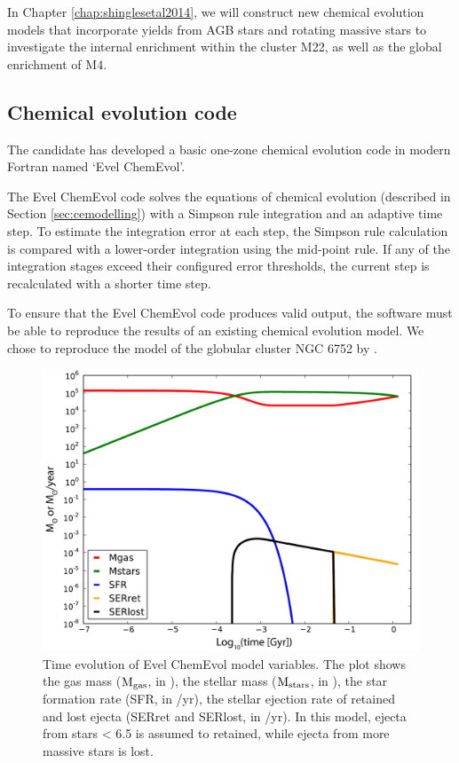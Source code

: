 In Chapter \ref{chap:shinglesetal2014}, we will construct new chemical evolution models that incorporate yields from \gls{AGB} stars and rotating massive stars to investigate the internal \sprocess enrichment within the cluster M22, as well as the global \sprocess enrichment of M4.

\subsection{Chemical evolution code}
The candidate has developed a basic one-zone chemical evolution code in modern Fortran named `Evel ChemEvol'.

The Evel ChemEvol code solves the equations of chemical evolution (described in Section \ref{sec:cemodelling}) with a Simpson rule integration and an adaptive time step. To estimate the integration error at each step, the Simpson rule calculation is compared with a lower-order integration using the mid-point rule. If any of the integration stages exceed their configured error thresholds, the current step is recalculated with a shorter time step.

To ensure that the Evel ChemEvol code produces valid output, the software must be able to reproduce the results of an existing chemical evolution model. We chose to reproduce the model of the globular cluster NGC 6752 by \citet[][hereafter, F04]{Fenner:2004ju}.

\begin{figure}
 \begin{center}\includegraphics[width=\textwidth]{figures/cemodel}\end{center}
 \caption{Time evolution of Evel ChemEvol model variables. The plot shows the gas mass ($\mathrm{M}_\mathrm{gas}$, in \Msun), the stellar mass ($\mathrm{M}_\mathrm{stars}$, in \Msun), the star formation rate (SFR, in \Msun/yr), the stellar ejection rate of retained and lost ejecta (SERret and SERlost, in \Msun/yr). In this model, ejecta from stars < 6.5 \Msun is assumed to retained, while ejecta from more massive stars is lost.}\label{fig:cemodel}
\end{figure}

